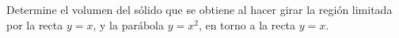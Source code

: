 \item Determine el volumen del sólido que se obtiene al hacer girar la región limitada por la recta $y = x$, y la parábola $y = x^2$, en torno a la recta $y = x$.
